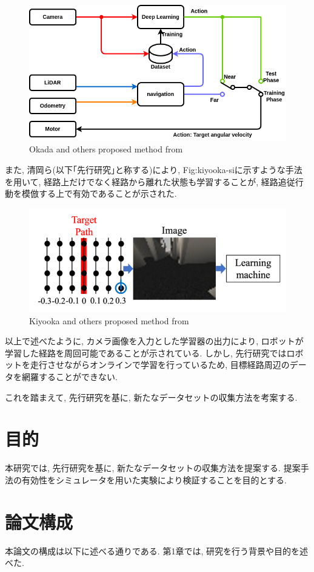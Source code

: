 \begin{figure}[h]
     \centering
     \includegraphics[keepaspectratio, scale=0.45]
     {images/okada-method.png}
     \caption{Okada and others proposed method from \cite{okada-si}}
     \label{Fig:okada-method}
     \end{figure}

\newpage
また, 清岡ら\cite{kiyooka-si}(以下｢先行研究｣と称する)により, {Fig:kiyooka-si}に示すような手法を用いて, 経路上だけでなく経路から離れた状態も学習することが, 経路追従行動を模倣する上で有効であることが示された. 

\vspace{10mm}

\begin{figure}[h]
     \centering
     \includegraphics[keepaspectratio, scale=0.45]{images/kiyooka-si-1.png}
     \caption{Kiyooka and others proposed method from \cite{kiyooka-si}}
     \label{Fig:kiyooka-si}
     \end{figure}

\vspace{20mm}
以上で述べたように, カメラ画像を入力とした学習器の出力により, ロボットが学習した経路を周回可能であることが示されている. しかし, 先行研究ではロボットを走行させながらオンラインで学習を行っているため, 目標経路周辺のデータを網羅することができない. \par これを踏まえて, 先行研究を基に, 新たなデータセットの収集方法を考案する.

\newpage
\section{目的}
本研究では, 先行研究を基に, 新たなデータセットの収集方法を提案する. 提案手法の有効性をシミュレータを用いた実験により検証することを目的とする. 

\section{論文構成}
本論文の構成は以下に述べる通りである. 第1章では, 研究を行う背景や目的を述べた. 
     
